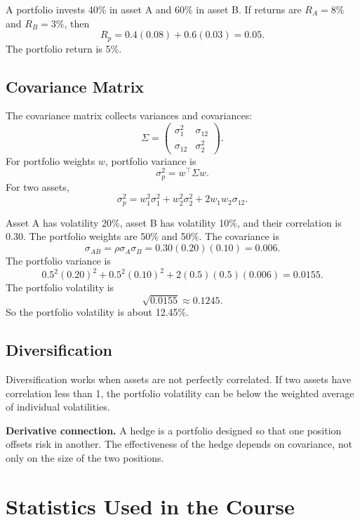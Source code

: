 \begin{exmp}
A portfolio invests 40\% in asset A and 60\% in asset B. If returns are
$R_A=8\%$ and $R_B=3\%$, then
\[
    R_p=0.4(0.08)+0.6(0.03)=0.05.
\]
The portfolio return is 5\%.
\end{exmp}

\subsection{Covariance Matrix}

The covariance matrix collects variances and covariances:
\[
    \Sigma=
    \begin{pmatrix}
    \sigma_1^2 & \sigma_{12}\\
    \sigma_{12} & \sigma_2^2
    \end{pmatrix}.
\]
For portfolio weights $w$, portfolio variance is
\[
    \sigma_p^2=w^\top\Sigma w.
\]
For two assets,
\[
    \sigma_p^2
    =
    w_1^2\sigma_1^2+w_2^2\sigma_2^2+2w_1w_2\sigma_{12}.
\]

\begin{exmp}
Asset A has volatility 20\%, asset B has volatility 10\%, and their correlation
is 0.30. The portfolio weights are 50\% and 50\%. The covariance is
\[
    \sigma_{AB}=\rho\sigma_A\sigma_B=0.30(0.20)(0.10)=0.006.
\]
The portfolio variance is
\[
    0.5^2(0.20)^2+0.5^2(0.10)^2+2(0.5)(0.5)(0.006)
    =
    0.0155.
\]
The portfolio volatility is
\[
    \sqrt{0.0155}\approx 0.1245.
\]
So the portfolio volatility is about 12.45\%.
\end{exmp}

\subsection{Diversification}

Diversification works when assets are not perfectly correlated. If two assets
have correlation less than 1, the portfolio volatility can be below the weighted
average of individual volatilities.

\begin{boxD}
\textbf{Derivative connection.} A hedge is a portfolio designed so that one
position offsets risk in another. The effectiveness of the hedge depends on
covariance, not only on the size of the two positions.
\end{boxD}

\section{Statistics Used in the Course}

